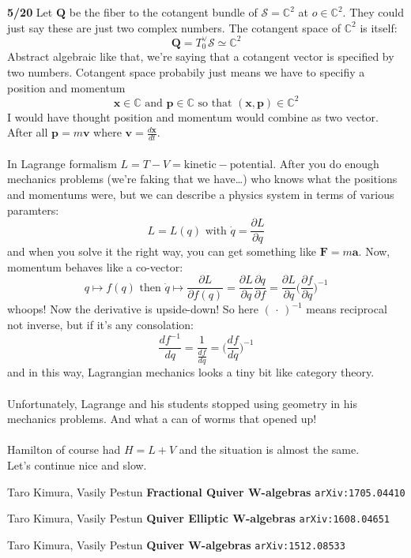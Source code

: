 \documentclass[12pt]{article}
\begin{document}
\noindent \textbf{5/20} Let $\mathbf{Q}$ be the fiber to the cotangent bundle of $\mathcal{S} = \mathbb{C}^2$ at $o \in \mathbb{C}^2$. They could just say these are just two complex numbers.  The cotangent space of $\mathbb{C}^2$ is itself:
$$  \mathbf{Q} = T_0^\vee \mathcal{S} \simeq \mathbb{C}^2 $$
Abstract algebraic like that, we're saying that a cotangent vector is specified by two numbers.  Cotangent space probabily just means we have to specifiy a position and momentum
$$ \mathbf{x} \in \mathbb{C} \text{ and }  \mathbf{p} \in \mathbb{C}  \text{ so that }(\mathbf{x},\mathbf{p}) \in \mathbb{C}^2 $$
I would have thought position and momentum would combine as two vector.  After all $\mathbf{p} = m \mathbf{v}$ where $\mathbf{v} = \frac{d\mathbf{x}}{dt}$. \\ \\
In Lagrange formalism $L = T - V  = \text{kinetic} - \text{potential}$.  After you do enough mechanics problems (we're faking that we have\dots) who knows what the positions and momentums were, but we can describe a physics system in terms of various paramters:
$$ L = L(q) \text{ with } \dot{q} = \frac{\partial L}{\partial q}$$
and when you solve it the right way, you can get something like $\mathbf{F} = m \mathbf{a}$.  Now, momentum behaves like a co-vector:
$$ q \mapsto f(q) \text{ then }\dot{q} \mapsto \frac{\partial L}{\partial f(q)}
= \frac{\partial L}{\partial q} \frac{\partial q}{\partial f}
= \frac{\partial L}{\partial q} \Big(\frac{\partial f}{\partial q}\Big)^{-1} $$
whoops!  Now the derivative is upside-down! So here $(\,\cdot\,)^{-1}$ means reciprocal not inverse, but if it's any consolation:
$$ \frac{df^{-1}}{dq} = \frac{1}{\frac{df}{dq}} = \Big( \frac{df}{dq} \Big)^{-1} $$
and in this way, Lagrangian mechanics looks a tiny bit like category theory.  \\ \\
Unfortunately, Lagrange and his students stopped using geometry in his mechanics problems.  And what a can of worms that opened up! \\ \\
Hamilton of course had $H = L + V$ and the situation is almost the same. \\  Let's continue nice and slow.

\vfill

\begin{thebibliography}{}

\item Taro Kimura, Vasily Pestun \textbf{Fractional Quiver W-algebras} \texttt{arXiv:1705.04410}

\item Taro Kimura, Vasily Pestun \textbf{Quiver Elliptic W-algebras} \texttt{arXiv:1608.04651}

\item Taro Kimura, Vasily Pestun \textbf{Quiver W-algebras} \texttt{arXiv:1512.08533}






\end{thebibliography}
\end{document}
